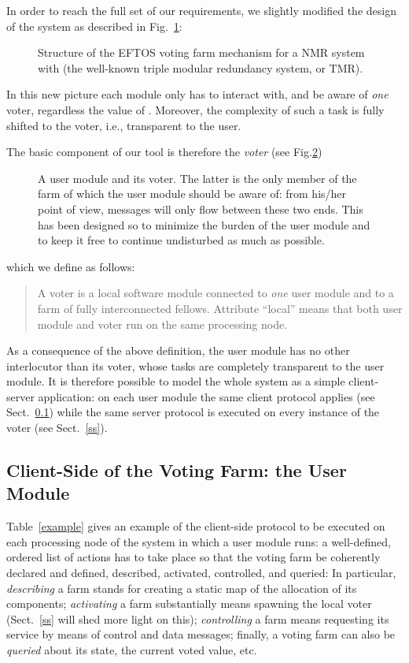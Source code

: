 \documentclass[11pt]{article}
\begin{document}
In order to reach the full set of our requirements, we slightly
modified the design of the system as described in Fig.~\ref{ronew}:
\begin{figure}
\centerline{}
\caption{Structure of the EFTOS voting farm mechanism for a NMR{} system with
 (the well-known triple modular redundancy system, or TMR).}\label{ronew}
\end{figure}
In this new picture each module only has to interact with, and be aware 
of {\em one\/} voter,
regardless the value of . Moreover, the complexity of such a task
is fully shifted to the voter, i.e., transparent to the user.



The basic component of our tool is therefore the {\em voter\/} (see Fig.\ref{voter})
\begin{figure}
\centerline{}
\caption{A user module and its voter. The latter is the
only member of the farm of which the user module should be aware of:
from his/her point of view, messages will only flow between these two ends.
This has been designed so to minimize the burden of the user module
and to keep it free to continue undisturbed as much as possible.}\label{voter}
\end{figure}
which we define as follows:
\begin{quote}
A voter is a local software module connected to {\em one\/}
user module and to a farm of fully interconnected fellows.
Attribute ``local'' means that both user module and voter
run on the same processing node.
\end{quote}


As a consequence of the above definition, the user module has
no other interlocutor than its voter, whose tasks are completely
transparent to the user module. It is therefore possible to model
the whole system as a simple client-server application:
on each user module the same client protocol applies (see Sect.~\ref{cs})
while the same server protocol is executed on every instance of the voter
(see Sect.~\ref{ss}).



\subsection{Client-Side of the Voting Farm: the User Module}\label{cs}
Table~\ref{example} gives an example of the client-side protocol
to be executed on each processing node of the system in which a
user module runs: a well-defined, ordered list of actions has to take place
so that the voting farm be coherently declared and defined,
described, activated, controlled, and queried:
In particular, {\em describing\/} a farm stands for
creating a static map of the allocation of its components; 
{\em activating\/} a farm substantially
means spawning the local voter (Sect.~\ref{ss} will shed more light
on this); {\em controlling\/} a farm means requesting its service
by means of control and data messages;
finally, a voting farm can also be {\em queried\/} about its state, 
the current voted value, etc.
\end{document}

